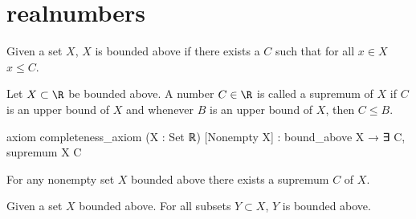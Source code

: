 \chapter{realnumbers}
\label{cha:realnums}

\begin{definition}\label{def:boundabove}
  \leanok
  Given a set $X$,
  $X$ is bounded above if there exists a $C$ such that for all $x \in X$ $x \leq C$.
\end{definition}

\begin{definition}[Supremum]\label{def:supremum}
  \leanok
  Let $X \subset \R$ be bounded above.
  A number $C \in \R$ is called a supremum of $X$ if $C$ is an upper bound of $X$ and whenever $B$ is an upper bound of $X$,
  then $C \leq B$.
\end{definition}

axiom completeness_axiom (X : Set ℝ) [Nonempty X] : bound_above X → ∃ C, supremum X C
\begin{axiom}\label{ax:complax}
  \leanok
  For any nonempty set $X$ bounded above there exists a supremum $C$ of $X$.
\end{axiom}

\begin{lemma}
  \label{lem:subsetboundbounded}
  \leanok
  Given a set $X$ bounded above.
  For all subsets $Y \subset X$,
  $Y$ is bounded above.
\end{lemma}
